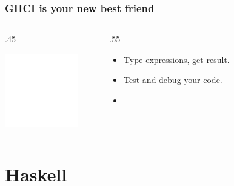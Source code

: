 \documentclass[17pt]{beamer}
\renewcommand{\(}[1]{\begin{columns}[#1]}
\renewcommand{\)}{\end{columns}}
\newcommand{\<}[1]{\begin{column}{#1}}
\renewcommand{\>}{\end{column}}
\begin{document}
\begin{frame}
  \frametitle{GHCI is your new best friend}
  \({c}
  \<{.45\textwidth}
  \begin{center}
    \includegraphics[width=0.8\textwidth]{img/replace_me_with_anything_you_want}
  \end{center}
  \>
  \<{.55\textwidth}
  \begin{center}
  \begin{itemize}
    \item Type expressions, get result.
    \item Test and debug your code.
    \item {}
  \end{itemize}
  \end{center}
  \>
  \)
\end{frame}




\section{Haskell}
\end{document}

